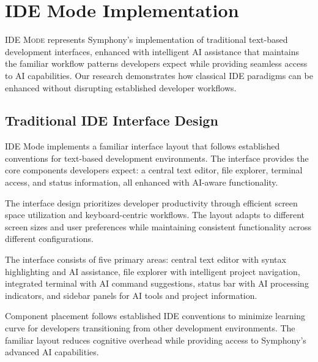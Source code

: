 
\section*{IDE Mode Implementation}

\lettrine{I}{DE Mode} represents Symphony's implementation of traditional text-based development interfaces, enhanced with intelligent AI assistance that maintains the familiar workflow patterns developers expect while providing seamless access to AI capabilities. Our research demonstrates how classical IDE paradigms can be enhanced without disrupting established developer workflows.

\subsection*{Traditional IDE Interface Design}

IDE Mode implements a familiar interface layout that follows established conventions for text-based development environments. The interface provides the core components developers expect: a central text editor, file explorer, terminal access, and status information, all enhanced with AI-aware functionality.

The interface design prioritizes developer productivity through efficient screen space utilization and keyboard-centric workflows. The layout adapts to different screen sizes and user preferences while maintaining consistent functionality across different configurations.

\begin{infobox}[title=IDE Mode Components]
The interface consists of five primary areas: central text editor with syntax highlighting and AI assistance, file explorer with intelligent project navigation, integrated terminal with AI command suggestions, status bar with AI processing indicators, and sidebar panels for AI tools and project information.
\end{infobox}

Component placement follows established IDE conventions to minimize learning curve for developers transitioning from other development environments. The familiar layout reduces cognitive overhead while providing access to Symphony's advanced AI capabilities.

